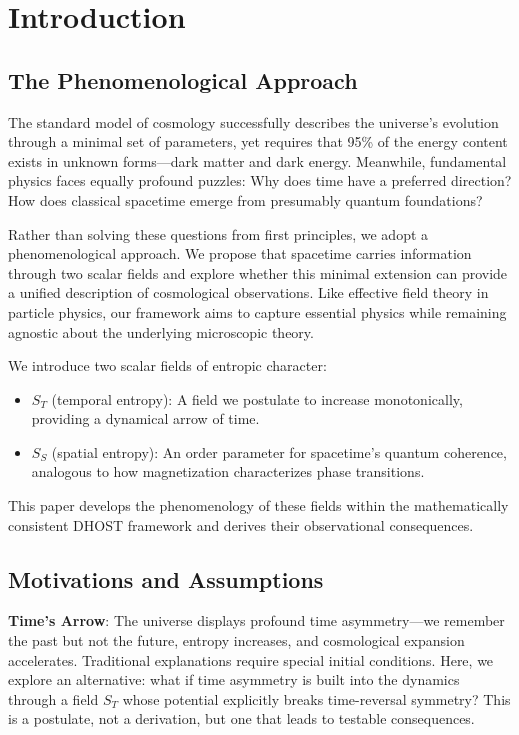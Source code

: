 \documentclass[12pt]{article}
\begin{document}
\section{Introduction}

\subsection{The Phenomenological Approach}

The standard model of cosmology successfully describes the universe's evolution through a minimal set of parameters, yet requires that 95\% of the energy content exists in unknown forms---dark matter and dark energy. Meanwhile, fundamental physics faces equally profound puzzles: Why does time have a preferred direction? How does classical spacetime emerge from presumably quantum foundations?

Rather than solving these questions from first principles, we adopt a phenomenological approach. We propose that spacetime carries information through two scalar fields and explore whether this minimal extension can provide a unified description of cosmological observations. Like effective field theory in particle physics, our framework aims to capture essential physics while remaining agnostic about the underlying microscopic theory.

We introduce two scalar fields of entropic character:
\begin{itemize}
    \item $S_T$ (temporal entropy): A field we postulate to increase monotonically, providing a dynamical arrow of time.
    \item $S_S$ (spatial entropy): An order parameter for spacetime's quantum coherence, analogous to how magnetization characterizes phase transitions.
\end{itemize}

This paper develops the phenomenology of these fields within the mathematically consistent DHOST framework and derives their observational consequences.

\subsection{Motivations and Assumptions}

\textbf{Time's Arrow}: The universe displays profound time asymmetry---we remember the past but not the future, entropy increases, and cosmological expansion accelerates. Traditional explanations require special initial conditions. Here, we explore an alternative: what if time asymmetry is built into the dynamics through a field $S_T$ whose potential explicitly breaks time-reversal symmetry? This is a postulate, not a derivation, but one that leads to testable consequences.
\end{document}
